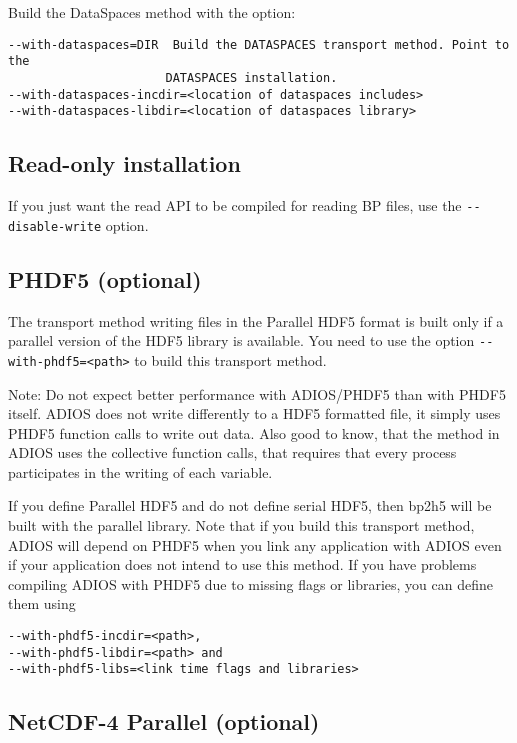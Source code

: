 \noindent Build the DataSpaces method with the option:

\begin{lstlisting}
--with-dataspaces=DIR  Build the DATASPACES transport method. Point to the
                      DATASPACES installation.
--with-dataspaces-incdir=<location of dataspaces includes>
--with-dataspaces-libdir=<location of dataspaces library>
\end{lstlisting}

 
\subsection{Read-only installation}

If you just want the read API to be compiled for reading BP files, use the \verb+--disable-write+ option.

\subsection{PHDF5 (optional)}

The transport method writing files in the Parallel HDF5 format is built only if 
a parallel version of the HDF5 library is available. You need to use the 
option \verb+--with-phdf5=<path>+ to build this transport method. 

Note: Do not expect better performance with ADIOS/PHDF5 than with PHDF5 itself. ADIOS does not write differently to a HDF5 formatted file, it simply uses PHDF5 function calls to write out data. Also good to know, that the method in ADIOS uses the collective function calls, that requires that every process participates in the writing of each variable. 

If you define Parallel HDF5 and do not define serial HDF5, then bp2h5 will be built 
with the parallel library. 
Note that if you build this transport method, ADIOS will depend on PHDF5 when you 
link any application with ADIOS even if your application does not intend to 
use this method. 
If you have problems compiling ADIOS with PHDF5 due to missing flags or libraries, 
you can define them using 

\begin{lstlisting}
--with-phdf5-incdir=<path>,
--with-phdf5-libdir=<path> and 
--with-phdf5-libs=<link time flags and libraries>
\end{lstlisting}

\subsection{NetCDF-4 Parallel (optional)}

